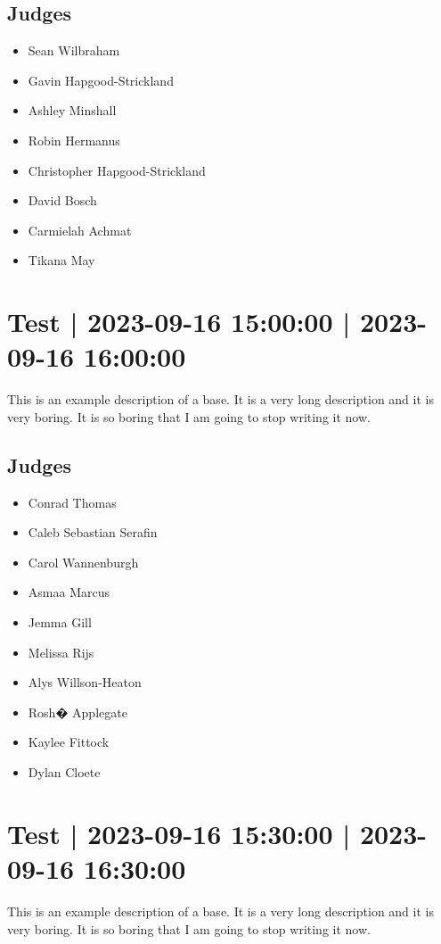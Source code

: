 \documentclass[10pt]{article}
\begin{document}
	\subsection*{Judges}
	\begin{itemize}

			\item Sean Wilbraham
			\item Gavin Hapgood-Strickland
			\item Ashley Minshall
			\item Robin Hermanus
			\item Christopher Hapgood-Strickland
			\item David Bosch
			\item Carmielah Achmat
			\item Tikana May
		\end{itemize}

			\setcounter{section}{10}
	\section{Test | 2023-09-16 15:00:00 | 2023-09-16 16:00:00}
	This is an example description of a base. It is a very long description and it is very boring. It is so boring that I am going to stop writing it now.

	\subsection*{Judges}
	\begin{itemize}

			\item Conrad Thomas
			\item Caleb Sebastian Serafin
			\item Carol Wannenburgh
			\item Asmaa Marcus
			\item Jemma Gill
			\item Melissa Rijs
			\item Alys Willson-Heaton
			\item Rosh� Applegate
			\item Kaylee Fittock
			\item Dylan Cloete
		\end{itemize}

			\setcounter{section}{11}
	\section{Test | 2023-09-16 15:30:00 | 2023-09-16 16:30:00}
	This is an example description of a base. It is a very long description and it is very boring. It is so boring that I am going to stop writing it now.
\end{document}
